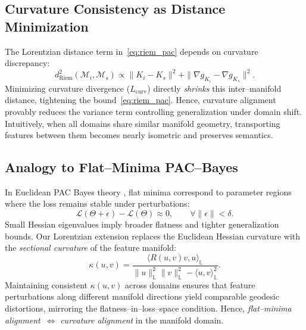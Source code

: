 \documentclass[10pt]{article} %
\begin{document}
\subsection{Curvature Consistency as Distance Minimization}
The Lorentzian distance term in~\eqref{eq:riem_pac} depends on
curvature discrepancy:
\begin{equation}
d_{\mathrm{Riem}}^2(\mathcal{M}_i,\mathcal{M}_s)
  \propto
  \|K_i-K_s\|^2
  + \|\nabla g_{K_i}-\nabla g_{K_s}\|^2.
\label{eq:curv_dist}
\end{equation}
Minimizing curvature divergence ($L_{\text{curv}}$) directly
\emph{shrinks} this inter--manifold distance, tightening the
bound~\eqref{eq:riem_pac}. Hence, curvature alignment provably reduces
the variance term controlling generalization under domain shift.
Intuitively, when all domains share similar manifold geometry,
transporting features between them becomes nearly isometric and
preserves semantics.

\subsection{Analogy to Flat--Minima PAC--Bayes}
In Euclidean PAC Bayes theory
\cite{mcallester2003pac,lotfi2022pac},
flat minima correspond to parameter regions where the loss remains
stable under perturbations:
\begin{equation}
\mathcal{L}(\Theta+\epsilon)-\mathcal{L}(\Theta)\approx0,
\qquad
\forall\|\epsilon\|<\delta.
\end{equation}
Small Hessian eigenvalues imply broader flatness and tighter
generalization bounds.  Our Lorentzian extension replaces the Euclidean
Hessian curvature with the \emph{sectional curvature} of the feature
manifold:
\begin{equation}
\kappa(u,v)
=
\frac{
\langle R(u,v)v,u\rangle_{\mathbb{L}}
}{
\|u\|_{\mathbb{L}}^{2}\|v\|_{\mathbb{L}}^{2}
 - \langle u,v\rangle_{\mathbb{L}}^{2}
}.
\label{eq:sectional}
\end{equation}
Maintaining consistent $\kappa(u,v)$ across domains ensures that feature
perturbations along different manifold directions yield comparable
geodesic distortions, mirroring the flatness--in--loss--space condition.
Hence, \emph{flat--minima alignment}~$\Leftrightarrow$
\emph{curvature alignment} in the manifold domain.
\end{document}
